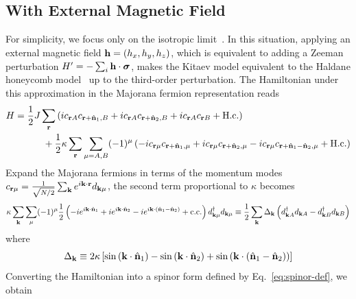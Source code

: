 \subsection{With External Magnetic Field}
For simplicity, we focus only on the isotropic limit~\cite{Kitaev_2006}. In this situation, applying an external magnetic field $\mathbf{h} = \left( h_x,h_y,h_z \right)$, which is equivalent to adding a Zeeman perturbation $H' = -\sum_{i}\mathbf{h}\cdot\boldsymbol{\sigma}$, makes the Kitaev model equivalent to the Haldane honeycomb model~\cite{Haldane_1988} up to the third-order perturbation. The Hamiltonian under this approximation in the Majorana fermion representation reads
\begin{align*}
    H 
    &= 
    \frac{1}{2}J\sum_{\mathbf{r}}
    \left( 
        ic_{\mathbf{r}A}c_{\mathbf{r}+\hat{\mathbf{n}}_1,B} 
        + 
        ic_{\mathbf{r}A}c_{\mathbf{r}+\hat{\mathbf{n}}_2,B}
        +
        ic_{\mathbf{r}A}c_{\mathbf{r}B}
        +\mathrm{H.c.}
     \right) \\
    &\quad\quad\quad
    + 
    \frac{1}{2}\kappa
    \sum_{\mathbf{r}}\sum_{\mu = A,B}
    (-1)^\mu
    \left( -i
        c_{\mathbf{r}\mu}c_{\mathbf{r}+\hat{\mathbf{n}}_1,\mu}
        +i
        c_{\mathbf{r}\mu}c_{\mathbf{r}+\hat{\mathbf{n}}_2,\mu}
        -i
        c_{\mathbf{r}\mu}c_{\mathbf{r}+\hat{\mathbf{n}}_1-\hat{\mathbf{n}}_2,\mu}
        +
        \mathrm{H.c.}
     \right)
\end{align*}
Expand the Majorana fermions in terms of the momentum modes $c_{\mathbf{r}\mu} = \frac{1}{\sqrt{N/2}}\sum_{\mathbf{k}} e^{i\mathbf{k}\cdot\mathbf{r}} d_{\mathbf{k}\mu}$, the second term proportional to $\kappa$ becomes
\[
\kappa
\sum_{\mathbf{k}}
\sum_{\mu}
(-1)^{\mu}
\frac{1}{2}
\left( 
    -i e^{i\mathbf{k}\cdot\hat{\mathbf{n}}_1}
    +i e^{i\mathbf{k}\cdot\hat{\mathbf{n}}_2}
    -i e^{i\mathbf{k}\cdot\left( \hat{\mathbf{n}}_1 - \hat{\mathbf{n}}_2 \right)}
    + \mathrm{c.c.}
 \right)   
d^\dagger_{\mathbf{k}\mu} d_{\mathbf{k}\mu}
\equiv
\frac{1}{2}
\sum_{\mathbf{k}}
\Delta_{\mathbf{k}}
\left( 
d^\dagger_{\mathbf{k}A} d_{\mathbf{k}A}
-
d^\dagger_{\mathbf{k}B} d_{\mathbf{k}B}
 \right)
\]
where
\begin{equation}\label{eq:gap-def}
    \Delta_{\mathbf{k}} \equiv
    2\kappa
    \left[ 
    \sin\left( \mathbf{k}\cdot\hat{\mathbf{n}}_1 \right)
    -
    \sin\left( \mathbf{k}\cdot\hat{\mathbf{n}}_2 \right)
    +
    \sin\left( \mathbf{k}\cdot\left( \hat{\mathbf{n}}_1 - \hat{\mathbf{n}}_2 \right) \right)
     \right]
\end{equation}
Converting the Hamiltonian into a spinor form defined by Eq.~\eqref{eq:spinor-def}, we obtain
